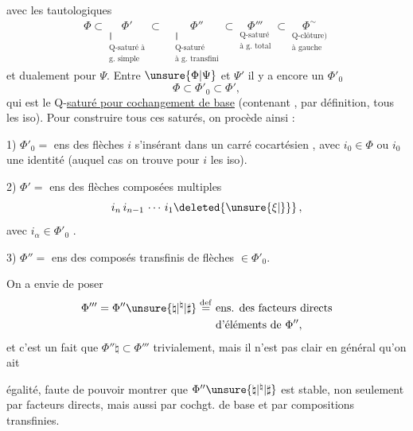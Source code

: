 avec les 
tautologiques
\[
\begin{aligned}
\Phi\subset
\underset{\substack{\Vert\\\text{Q-saturé à}\\\text{g. simple}}}{\Phi'}
\subset{}&
\underset{\substack{\Vert\\\text{Q-saturé}\\\text{à g. transfini}}}{\Phi''}
\subset
\underset{\substack{\text{Q-saturé}\\\text{à g. total}}}{\Phi'''}
\subset
\underset{\substack{\text{Q-clôture)}\\\text{à gauche}}}{\Phi^{\sim}}
\end{aligned}\tag*{(1.7)}
\]
et dualement pour $\Psi$. Entre $\unsure{\Phi|\Psi}$ et $\Psi'$
il y a encore un $\Phi'_0$
\[
 \Phi\subset\Phi'_0\subset\Phi',\tag*{(1.8)}
\]
qui est le Q-\uline{saturé pour cochangement de base} (contenant
, par définition, tous les iso). Pour construire
tous ces saturés, on procède ainsi :

1) $\Phi'_0=$ ens des flèches $i$
s'insérant dans un carré cocartésien
,
avec $i_0\in\Phi$  ou $i_0$ une identité
(auquel cas on trouve pour $i$ les iso).

2) $\Phi'=$ ens des flèches composées multiples
\[
 i_n\,i_{n-1}\,\cdots\,i_1\deleted{\unsure{\xi|\}}}\,,
\]
avec $i_\alpha\in\Phi'_0$ \deleted{\unsure{$\xi$}}.

3) $\Phi''=$ ens des composés transfinis de flèches $\in\Phi'_0$.

 On a envie de poser
\[
 \begin{aligned}
 \Phi'''=\Phi''\unsure{\natural|{}^{\natural}|\sharp}\overset{\mathrm{def}}{=}
 &\ \text{ens. des facteurs directs}\\
 &\ \text{d'éléments de }\Phi'',
 \end{aligned}
\]
et c'est un fait que $\Phi''\natural\subset\Phi'''$ trivialement, mais
il n'est pas clair en général qu'on ait

égalité, faute de pouvoir montrer que $\Phi''\unsure{\natural|{}^{\natural}|\sharp}$
est stable, non seulement par facteurs directs, mais aussi par cochgt.
de base et par compositions transfinies.

